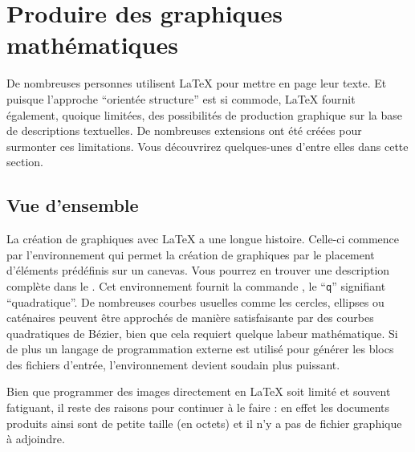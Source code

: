 

\setcounter{chapter}{4}
\newcommand{\graphicscompanion}{\emph{The \LaTeX{} Graphics Companion}~\cite{graphicscompanion}}
\newcommand{\hobby}{\emph{A User's Manual for \MP{}}~\cite{metapost}}
\newcommand{\hoenig}{\emph{\TeX{} Unbound}~\cite{unbound}}
\newcommand{\graphicsinlatex}{\emph{Graphics in \LaTeXe{}}~\cite{ursoswald}}

\chapter{Produire des graphiques mathématiques}
\label{chap:graphics}

\begin{intro}
De nombreuses personnes utilisent \LaTeX{} pour mettre en page leur
texte. Et puisque l'approche \enquote{orientée structure} est si
commode, \LaTeX{} fournit également, quoique limitées, des
possibilités de production graphique sur la base de descriptions
textuelles. De nombreuses extensions ont été créées pour surmonter ces
limitations. Vous découvrirez quelques-unes d'entre elles dans cette
section.
\end{intro}

\section{Vue d'ensemble}

La création de graphiques avec \LaTeX{} a une longue
histoire. Celle-ci commence par l'environnement  qui
permet la création de graphiques par le placement d'éléments
prédéfinis sur un canevas. Vous pourrez en trouver une description
complète dans le \manual. Cet environnement fournit la commande
, le \enquote{\texttt{q}} signifiant \enquote{quadratique}. De nombreuses
courbes usuelles comme les cercles, ellipses ou caténaires peuvent
être approchés de manière satisfaisante par des courbes quadratiques
de Bézier, bien que cela requiert quelque labeur mathématique. Si de
plus un langage de programmation externe est utilisé pour générer
les blocs  des fichiers d'entrée, l'environnement
 devient soudain plus puissant.

Bien que programmer des images directement en \LaTeX{} soit limité et
souvent fatiguant, il reste des raisons pour continuer à le faire : en
effet les documents produits ainsi sont de petite taille (en octets)
et il n'y a pas de fichier graphique à adjoindre.

